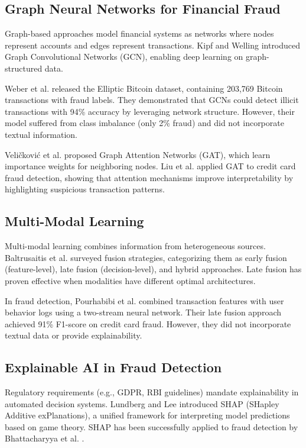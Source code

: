 \subsection{Graph Neural Networks for Financial Fraud}

Graph-based approaches model financial systems as networks where nodes represent accounts and edges represent transactions. Kipf and Welling \cite{kipf2017semi} introduced Graph Convolutional Networks (GCN), enabling deep learning on graph-structured data.

Weber et al. \cite{weber2019anti} released the Elliptic Bitcoin dataset, containing 203,769 Bitcoin transactions with fraud labels. They demonstrated that GCNs could detect illicit transactions with 94\% accuracy by leveraging network structure. However, their model suffered from class imbalance (only 2\% fraud) and did not incorporate textual information.

Veličković et al. \cite{velickovic2018graph} proposed Graph Attention Networks (GAT), which learn importance weights for neighboring nodes. Liu et al. \cite{liu2021pick} applied GAT to credit card fraud detection, showing that attention mechanisms improve interpretability by highlighting suspicious transaction patterns.

\subsection{Multi-Modal Learning}

Multi-modal learning combines information from heterogeneous sources. Baltrusaitis et al. \cite{baltrusaitis2019multimodal} surveyed fusion strategies, categorizing them as early fusion (feature-level), late fusion (decision-level), and hybrid approaches. Late fusion has proven effective when modalities have different optimal architectures.

In fraud detection, Pourhabibi et al. \cite{pourhabibi2020fraud} combined transaction features with user behavior logs using a two-stream neural network. Their late fusion approach achieved 91\% F1-score on credit card fraud. However, they did not incorporate textual data or provide explainability.

\subsection{Explainable AI in Fraud Detection}

Regulatory requirements (e.g., GDPR, RBI guidelines) mandate explainability in automated decision systems. Lundberg and Lee \cite{lundberg2017unified} introduced SHAP (SHapley Additive exPlanations), a unified framework for interpreting model predictions based on game theory. SHAP has been successfully applied to fraud detection by Bhattacharyya et al. \cite{bhattacharyya2011data}.

